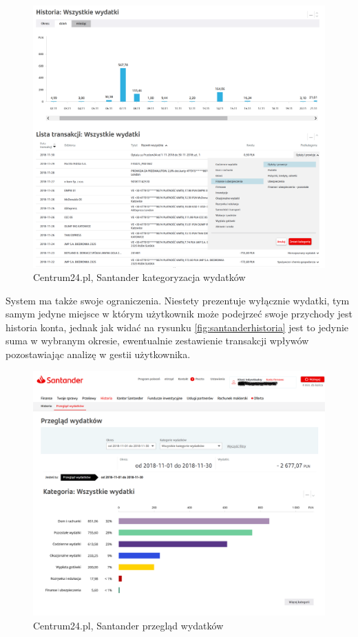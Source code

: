 \documentclass[a4paper,10pt, twoside]{report}
\begin{document}
\begin{large}
\begin{figure}[H]
    \includegraphics[width=12cm]{figures/Santander_PrzegladWydatkow_kategoryzacja.png}
    \caption{Centrum24.pl, Santander kategoryzacja wydatków}
    \label{fig:santanderkategoryzacja}
\end{figure}

{System ma także swoje ograniczenia. Niestety prezentuje wyłącznie wydatki, tym 
samym jedyne miejsce w którym użytkownik może podejrzeć swoje przychody jest 
historia konta, jednak jak widać na rysunku \ref{fig:santanderhistoria} jest to 
jedynie suma w wybranym okresie, ewentualnie zestawienie transakcji wpływów 
pozostawiając analizę w gestii użytkownika.}

\begin{figure}[H]           %
    \centering
    \includegraphics[width=12cm]{figures/Santander_PrzegladWydatkow_przeglad.png}
    \caption{Centrum24.pl, Santander przegląd wydatków}
    \label{fig:santanderprzeglad}
\end{figure}


\end{large}
\end{document}
